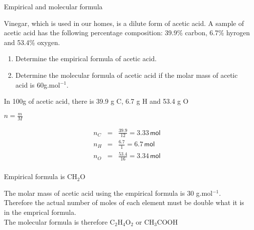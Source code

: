 \begin{wex}{Empirical and molecular formula\\}{Vinegar, which is used in our homes, is a dilute form of acetic acid. A sample of acetic acid has the following percentage composition: 39.9\% carbon, 6.7\% hyrogen and 53.4\% oxygen.

\begin{enumerate}
\item{Determine the empirical formula of acetic acid.}
\item{Determine the molecular formula of acetic acid if the molar mass of acetic acid is 60g.mol$^{-1}$.}
\end{enumerate}
}

{

In 100g of acetic acid, there is 39.9 g C, 6.7 g H and 53.4 g O \\
}

{

$n= \frac{m}{M}$

\begin{eqnarray*}
n_C&=& \frac{39.9}{12} = 3.33\, \textsf{mol} \\
n_H&=& \frac{6.7}{1} = 6.7\, \textsf{mol}  \\
n_O&=& \frac{53.4}{16} = 3.34\, \textsf{mol} \\
\end{eqnarray*}
}

{

Empirical formula is CH$_2$O\\
}

{

The molar mass of acetic acid using the empirical formula is 30 g.mol$^{-1}$. Therefore the actual number of moles of each element must be double what it is in the emprical formula.\\

The molecular formula is therefore C$_2$H$_4$O$_2$ or CH$_3$COOH
}
\end{wex}


